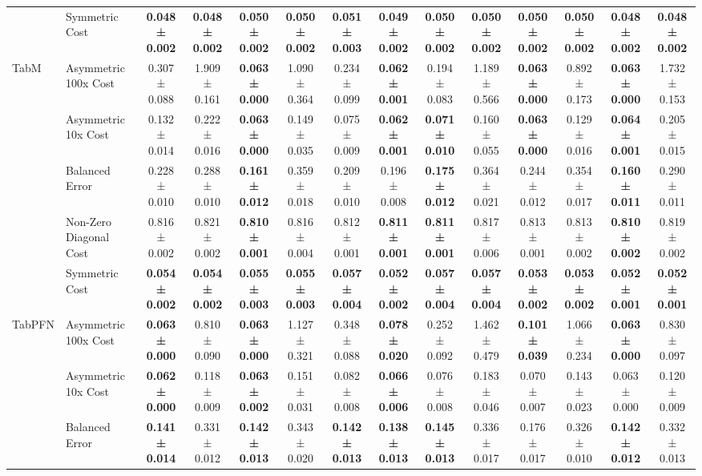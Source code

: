 \begin{table}[H]
{\begin{tabular}{llcccccccccccc}
 & Symmetric Cost & \textbf{0.048 ± 0.002} & \textbf{0.048 ± 0.002} & \textbf{0.050 ± 0.002} & \textbf{0.050 ± 0.002} & \textbf{0.051 ± 0.003} & \textbf{0.049 ± 0.002} & \textbf{0.050 ± 0.002} & \textbf{0.050 ± 0.002} & \textbf{0.050 ± 0.002} & \textbf{0.050 ± 0.002} & \textbf{0.048 ± 0.002} & \textbf{0.048 ± 0.002} \\
\cline{1-14}
\multirow[t]{5}{*}{TabM} & Asymmetric 100x Cost & 0.307 ± 0.088 & 1.909 ± 0.161 & \textbf{0.063 ± 0.000} & 1.090 ± 0.364 & 0.234 ± 0.099 & \textbf{0.062 ± 0.001} & 0.194 ± 0.083 & 1.189 ± 0.566 & \textbf{0.063 ± 0.000} & 0.892 ± 0.173 & \textbf{0.063 ± 0.000} & 1.732 ± 0.153 \\
 & Asymmetric 10x Cost & 0.132 ± 0.014 & 0.222 ± 0.016 & \textbf{0.063 ± 0.000} & 0.149 ± 0.035 & 0.075 ± 0.009 & \textbf{0.062 ± 0.001} & \textbf{0.071 ± 0.010} & 0.160 ± 0.055 & \textbf{0.063 ± 0.000} & 0.129 ± 0.016 & \textbf{0.064 ± 0.001} & 0.205 ± 0.015 \\
 & Balanced Error & 0.228 ± 0.010 & 0.288 ± 0.010 & \textbf{0.161 ± 0.012} & 0.359 ± 0.018 & 0.209 ± 0.010 & 0.196 ± 0.008 & \textbf{0.175 ± 0.012} & 0.364 ± 0.021 & 0.244 ± 0.012 & 0.354 ± 0.017 & \textbf{0.160 ± 0.011} & 0.290 ± 0.011 \\
 & Non-Zero Diagonal Cost & 0.816 ± 0.002 & 0.821 ± 0.002 & \textbf{0.810 ± 0.001} & 0.816 ± 0.004 & 0.812 ± 0.001 & \textbf{0.811 ± 0.001} & \textbf{0.811 ± 0.001} & 0.817 ± 0.006 & 0.813 ± 0.001 & 0.813 ± 0.002 & \textbf{0.810 ± 0.002} & 0.819 ± 0.002 \\
 & Symmetric Cost & \textbf{0.054 ± 0.002} & \textbf{0.054 ± 0.002} & \textbf{0.055 ± 0.003} & \textbf{0.055 ± 0.003} & \textbf{0.057 ± 0.004} & \textbf{0.052 ± 0.002} & \textbf{0.057 ± 0.004} & \textbf{0.057 ± 0.004} & \textbf{0.053 ± 0.002} & \textbf{0.053 ± 0.002} & \textbf{0.052 ± 0.001} & \textbf{0.052 ± 0.001} \\
\cline{1-14}
\multirow[t]{5}{*}{TabPFN} & Asymmetric 100x Cost & \textbf{0.063 ± 0.000} & 0.810 ± 0.090 & \textbf{0.063 ± 0.000} & 1.127 ± 0.321 & 0.348 ± 0.088 & \textbf{0.078 ± 0.020} & 0.252 ± 0.092 & 1.462 ± 0.479 & \textbf{0.101 ± 0.039} & 1.066 ± 0.234 & \textbf{0.063 ± 0.000} & 0.830 ± 0.097 \\
 & Asymmetric 10x Cost & \textbf{0.062 ± 0.000} & 0.118 ± 0.009 & \textbf{0.063 ± 0.002} & 0.151 ± 0.031 & 0.082 ± 0.008 & \textbf{0.066 ± 0.006} & 0.076 ± 0.008 & 0.183 ± 0.046 & 0.070 ± 0.007 & 0.143 ± 0.023 & 0.063 ± 0.000 & 0.120 ± 0.009 \\
 & Balanced Error & \textbf{0.141 ± 0.014} & 0.331 ± 0.012 & \textbf{0.142 ± 0.013} & 0.343 ± 0.020 & \textbf{0.142 ± 0.013} & \textbf{0.138 ± 0.013} & \textbf{0.145 ± 0.013} & 0.336 ± 0.017 & 0.176 ± 0.017 & 0.326 ± 0.010 & \textbf{0.142 ± 0.012} & 0.332 ± 0.013 \\

\end{tabular}}
\end{table}
